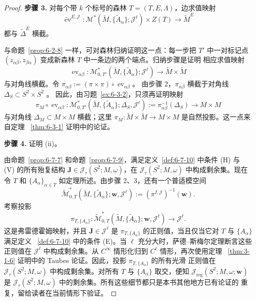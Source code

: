 \begin{proof}
\medskip
\noindent\textbf{步骤 3.}\quad
对每个带 $k$ 个标号的森林 $T=(T,E,\Lambda)$，边求值映射
\[
  \widetilde{\operatorname{ev}}^{E,\mathcal J}:
  \mathcal M^*(\widetilde M,\{\widetilde A_\alpha\};\mathcal J^\ell)\times Z(T)
  \longrightarrow\widetilde M^E
\]
都与 $\widetilde\Delta^E$ 横截。

与命题~\ref{prop:6-2-8} 一样，可对森林归纳证明这一点：每一步把 $T'$ 中一对标记点
$(z_{\alpha\beta},z_{\beta\alpha})$ 变成新森林 $T$ 中一条边的两个端点。归纳步骤是证明
相应求值映射
\[
  \operatorname{ev}_{\alpha\beta}:
  \mathcal M^*_{0,T'}(\widetilde M,\{\widetilde A_\alpha\};\mathcal J^\ell)
  \longrightarrow\widetilde M\times\widetilde M
\]
与对角线横截。令
$\pi_{\alpha\beta}:=(\pi\times\pi)\circ\operatorname{ev}_{\alpha\beta}$。
由步骤 2，$\pi_{\alpha\beta}$ 横截于对角线
$\Delta_S\subset S^2\times S^2$
。
因此，由习题~\ref{ex:6-3-2}，只须再证明映射
\[
  \pi_M\circ\operatorname{ev}_{\alpha\beta}:
  \mathcal M^*_{0,T'}
    (\widetilde M,\{\widetilde A_\alpha\};\Delta_S,\mathcal J^\ell)
  :=\pi_{\alpha\beta}^{-1}(\Delta_S)
  \longrightarrow M\times M
\]
与对角线 $\Delta_M\subset M\times M$ 横截；这里
$\pi_M:\widetilde M\times\widetilde M\to M\times M$ 是自然投影。这一点来自定理
~\ref{thm:6-3-1} 证明中的论证。

\medskip
\noindent\textbf{步骤 4.}\quad
证明 (ii)。

由命题~\ref{prop:6-7-7} 和命题~\ref{prop:6-7-9}，满足定义~\ref{def:6-7-10} 中条件
(H) 与 (V) 的所有殆复结构
$\mathbf J\in\mathcal J_\tau(S^2;M,\omega)$，在
$\mathcal J_\tau(S^2;M,\omega)$ 中构成剩余集。现在令 $T$ 和
$\{A_\alpha\}_{\alpha\in T}$ 如定理所述。由步骤 2、3，还有一个普适模空间
\[
  \widetilde{\mathcal M}^*_{0,T}
    (\widetilde M,\{\widetilde A_\alpha\};\mathbf w,\mathcal J^\ell)
  :=(\pi^{I,\mathcal J})^{-1}(\mathbf w).
\]
考察投影
\[
  \pi_{T,\{A_\alpha\}}:
  \widetilde{\mathcal M}^*_{0,T}
    (\widetilde M,\{\widetilde A_\alpha\};\mathbf w,\mathcal J^\ell)
  \longrightarrow\mathcal J^\ell.
\]
这是弗雷德霍姆映射，并且 $\mathbf J\in\mathcal J^\ell$ 是
$\pi_{T,\{A_\alpha\}}$ 的正则值，当且仅当它对 $T$ 与 $\{A_\alpha\}$ 满足定义
~\ref{def:6-7-10} 中的条件 (E)。当 $\ell$ 充分大时，萨德--斯梅尔定理断言这些正则值在
$\mathcal J^\ell$ 中构成剩余集。从 $C^\infty$ 情形化归到 $C^\ell$ 情形，再次使用定理
~\ref{thm:3-1-6} 证明中的 Taubes 论证。因此，投影 $\pi_{T,\{A_\alpha\}}$ 的所有光滑
正则值在 $\mathcal J_\tau(S^2;M,\omega)$ 中构成剩余集。对所有 $T$ 与
$\{A_\alpha\}$ 取交，便知
$\mathcal J_{\mathrm{reg}}(S^2;M,\omega;\mathbf w)$ 是
$\mathcal J_\tau(S^2;M,\omega)$ 中的剩余集。所有这些细节都只是本书其他地方已有论证的
重复，留给读者在当前情形下验证。
\end{proof}

